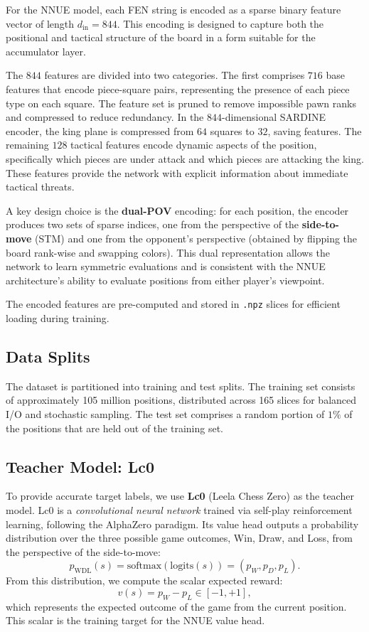 For the NNUE model, each FEN string is encoded as a sparse binary feature vector of length \(d_{\mathrm{in}} = 844\). This encoding is designed to capture both the positional and tactical structure of the board in a form suitable for the accumulator layer.

The \(844\) features are divided into two categories. The first comprises \(716\) base features that encode piece-square pairs, representing the presence of each piece type on each square. The feature set is pruned to remove impossible pawn ranks and compressed to reduce redundancy. In the \(844\)-dimensional SARDINE encoder, the king plane is compressed from \(64\) squares to \(32\), saving features. The remaining \(128\) tactical features encode dynamic aspects of the position, specifically which pieces are under attack and which pieces are attacking the king. These features provide the network with explicit information about immediate tactical threats.

A key design choice is the \textbf{dual-POV} encoding: for each position, the encoder produces two sets of sparse indices, one from the perspective of the \textbf{side-to-move} (STM) and one from the opponent's perspective (obtained by flipping the board rank-wise and swapping colors). This dual representation allows the network to learn symmetric evaluations and is consistent with the NNUE architecture's ability to evaluate positions from either player's viewpoint.

The encoded features are pre-computed and stored in \texttt{.npz} slices for efficient loading during training.

\subsection{Data Splits}\label{sec:data-splits}

The dataset is partitioned into training and test splits. The training set consists of approximately 105 million positions, distributed across 165 slices for balanced I/O and stochastic sampling. The test set comprises a random portion of \(1\%\) of the positions that are held out of the training set.

\subsection{Teacher Model: Lc0}\label{sec:teacher-lc0}

To provide accurate target labels, we use \textbf{Lc0} (Leela Chess Zero) as the teacher model. Lc0 is a \emph{convolutional neural network} trained via self-play reinforcement learning, following the AlphaZero paradigm. Its value head outputs a probability distribution over the three possible game outcomes, Win, Draw, and Loss, from the perspective of the side-to-move:
\[
p_{\mathrm{WDL}}(s) = \mathrm{softmax}(\mathrm{logits}(s)) = (p_W, p_D, p_L).
\]
From this distribution, we compute the scalar expected reward:
\[
v(s) = p_W - p_L \in [-1, +1],
\]
which represents the expected outcome of the game from the current position. This scalar is the training target for the NNUE value head.

